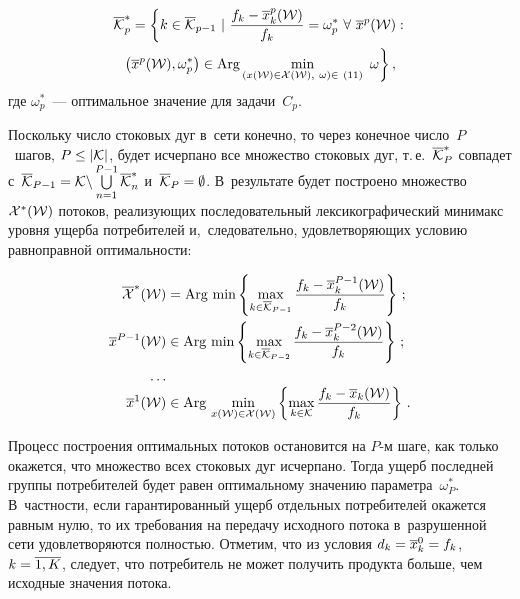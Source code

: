 \begin{multicols}{2}
\columnbreak

\noindent
\begin{multline*}
\overline {\cal K}_p^* = \left\{ k \in \overline {\cal K}_{p-1} \ | \ 
\fr{f_{k} - \overline x^p_{k}({\cal W})}{f_{k}} =\omega^*_p \  \forall \ \overline x^p({\cal W}) : \right.\\
\left. \left(\overline x^p({\cal W}), \omega^*_p\right)
\in \textrm{Arg} \min\limits_{(x({\cal W}) \in {\cal X}({\cal W}), \ \omega) \in\ (11)} \ 
\omega \right\}, 
\end{multline*}
где $\omega^*_p$~--- оптимальное значение для задачи~$C_{p}$.

Поскольку число стоковых дуг в~сети конечно, то через конечное число~$P$~шагов, 
$P \hm\le | {\cal K} |$, будет исчерпано все множество стоковых дуг, т.\,е.\
 $\overline {\cal K}_P^*$ совпадет с~$\overline {\cal K}_{P-1} \hm= {\cal K} \backslash 
 \bigcup\limits^{P-1}_{n=1}{\overline {\cal K}^*_n}$ и~$\overline {\cal K}_P \hm= \emptyset $. 
 В~результате будет построено множество~${\cal X}^*({\cal W})$ потоков, реализующих 
 последовательный лексикографический минимакс уровня ущерба  потребителей 
 и,~следовательно, удовлетворяющих условию равноправной оптимальности:
 
 \noindent
\begin{align*}
\overline{\cal X}^*({\cal W}) &=  \mathrm{Arg}\,\min  \left\{ \max\limits_{k \in \overline{\cal K}_{P-1}} 
\displaystyle\frac{\displaystyle f_{k} - \overline x_{k}^{P-1}({\cal W})\mathstrut}{\displaystyle f_{k}\mathstrut} \right\}\,; \\
\overline x^{P-1}({\cal W}) &\in  \mathrm{Arg}\,\min  \left\{ \max\limits_{k \in \overline {\cal K}_{P-2}} 
\displaystyle\frac{\displaystyle f_{k} - \overline x_{k}^{P-2}({\cal W})\mathstrut}{\displaystyle f_{k}\mathstrut} \right\}\,;\\
\ldots\\[-3pt]
\overline x^{1}({\cal W}) &\in  \mathrm{Arg}\,\min\limits_{x({\cal W}) \in {\cal X}({\cal W})}  \left\{ 
\max\limits_{k \in {\cal K}} \displaystyle\frac{\displaystyle f_{k} - \overline x_{k}({\cal W})\mathstrut}{\displaystyle f_{k}\mathstrut} \right\}\,.
\end{align*}

Процесс построения оптимальных потоков
остановится на $P$-м шаге, как только окажется, что множество всех 
стоковых  дуг исчерпано. Тогда ущерб  последней группы потребителей будет 
равен оптимальному значению параметра~$\omega^*_{P}$. 
В~част\-ности, если гарантированный ущерб отдельных  потребителей окажется 
равным нулю, то их требования на передачу исходного потока в~разрушенной 
сети удовлетворяются полностью. Отметим, что из условия $d_k \hm=  \overline x_k^0 \hm= f_k$,
$k \hm= \overline{1, K}$, следует, что потребитель не может получить продукта  больше, 
чем исходные значения потока.


\end{multicols}

